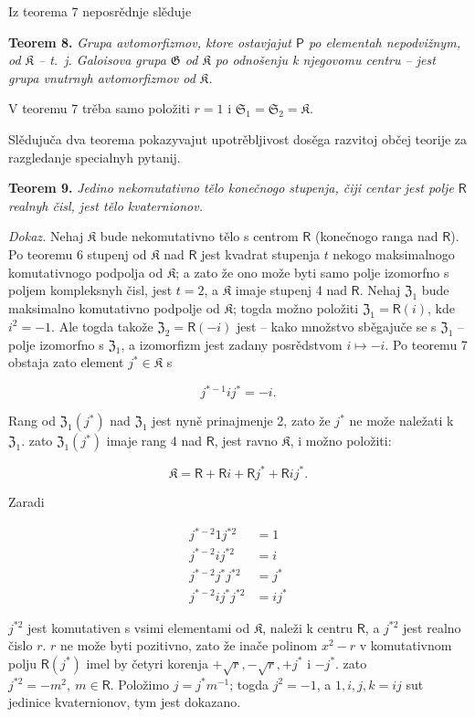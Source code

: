 \documentclass[11pt]{article}
\begin{document}
Iz teorema 7 neposrědnje slěduje

\textbf{Teorem 8.} \emph{Grupa avtomorfizmov, ktore ostavjajut \(\mathsf P\) po elementah nepodvižnym, od \(\mathfrak K\) -- t.~j. Galoisova grupa \(\mathfrak G\) od \(\mathfrak K\) po odnošenju k njegovomu centru -- jest grupa vnutrnyh avtomorfizmov od \(\mathfrak K\).}

V teoremu 7 trěba samo položiti \(r=1\) i \(\mathfrak S_1=\mathfrak S_2=\mathfrak K\).

Slědujuča dva teorema pokazyvajut upotrěbljivost dosěga razvitoj občej teorije za razgledanje specialnyh pytanij.

\textbf{Teorem 9.} \emph{Jedino nekomutativno tělo konečnogo stupenja, čiji centar jest polje \(\mathsf{R}\) realnyh čisl, jest tělo kvaternionov.}

\emph{Dokaz.} Nehaj \(\mathfrak K\) bude nekomutativno tělo s centrom \(\mathsf{R}\) (konečnogo ranga nad \(\mathsf{R}\)). Po teoremu 6 stupenj od \(\mathfrak K\) nad \(\mathsf{R}\) jest kvadrat stupenja \(t\) nekogo maksimalnogo komutativnogo podpolja od \(\mathfrak K\); a zato že ono može byti samo polje izomorfno s poljem kompleksnyh čisl, jest \(t=2\), a \(\mathfrak K\) imaje stupenj 4 nad \(\mathsf{R}\). Nehaj \(\mathfrak Z_1\) bude maksimalno komutativno podpolje od \(\mathfrak K\); togda možno položiti \(\mathfrak Z_1=\mathsf{R}(i)\), kde \(i^2=-1\). Ale togda takože \(\mathfrak Z_2=\mathsf{R}(-i)\) jest -- kako množstvo sběgajuče se s \(\mathfrak Z_1\) -- polje izomorfno s \(\mathfrak Z_1\), a izomorfizm jest zadany posrědstvom \(i\mapsto -i\). Po teoremu 7 obstaja zato element \(j^*\in\mathfrak K\) s

\[
j^{*-1}ij^*=-i.
\]

Rang od \(\mathfrak Z_1(j^*)\) nad \(\mathfrak Z_1\) jest nyně prinajmenje 2, zato že \(j^*\) ne može naležati k \(\mathfrak Z_1\). zato \(\mathfrak Z_1(j^*)\) imaje rang 4 nad \(\mathsf{R}\), jest ravno \(\mathfrak K\), i možno položiti:

\[
\mathfrak K=\mathsf R+\mathsf Ri+\mathsf Rj^*+\mathsf Rij^*.
\]

Zaradi

\[
\begin{aligned}
j^{*-2}1j^{*2}&=1\\
j^{*-2}ij^{*2}&=i\\
j^{*-2}j^*j^{*2}&=j^*\\
j^{*-2}ij^*j^{*2}&=ij^*
\end{aligned}
\]

\(j^{*2}\) jest komutativen s vsimi elementami od \(\mathfrak K\), naleži k centru \(\mathsf{R}\), a \(j^{*2}\) jest realno čislo \(r\). \(r\) ne može byti pozitivno, zato že inače polinom \(x^2-r\) v komutativnom polju \(\mathsf{R}(j^*)\) imel by četyri korenja \(+\sqrt r,-\sqrt r,+j^*\) i \(-j^*\). zato \(j^{*2}=-m^2,\ m\in \mathsf{R}\). Položimo \(j=j^*m^{-1}\); togda \(j^2=-1\), a \(1,i,j,k=ij\) sut jedinice kvaternionov, tym jest dokazano.
\end{document}

